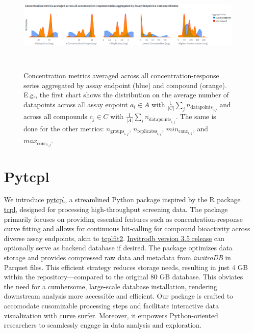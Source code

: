 \begin{figure}[htbp]  %
    \centering
    \includegraphics[width=1.0\textwidth]{figures/concentration_metric_distributions.png}  
    \caption{Concentration metrics averaged across all concentration-response series aggregated by assay endpoint (blue) and compound (orange). E.g., the first chart shows the distribution on the average number of datapoints across all assay enpoint $a_i \in A$ with $\frac{1}{|C|} \sum_{j} n_{\text{datapoints}_{i,j}}$ and across all compounds $c_j \in C$ with $\frac{1}{|A|} \sum_{i} n_{\text{datapoints}_{i,j}}$. The same is done for the other metrics: $n_{\text{groups}_{i,j}}$, $n_{\text{replicates}_{i,j}}$, $min_{\text{conc}_{i,j}}$, and $max_{\text{conc}_{i,j}}$.
    }
~\label{fig:concentration_metric_distributions} 
\end{figure}


\section{Pytcpl}
We introduce \href{https://github.com/rbBosshard/pytcpl}{pytcpl}, a streamlined Python package inspired by the R package \href{https://github.com/USEPA/CompTox-ToxCast-tcpl}{tcpl}, designed for processing high-throughput screening data. The package primarily focuses on providing essential features such as concentration-response curve fitting and allows for continuous hit-calling for compound bioactivity across diverse assay endpoints, akin to \href{https://github.com/USEPA/CompTox-ToxCast-tcplFit2}{tcplfit2}. \href{https://cfpub.epa.gov/si/si_public_record_Report.cfm?dirEntryId=355484&Lab=CCTE}{Invitrodb version 3.5 release} can optionally serve as backend database if desired. The package optimizes data storage and provides compressed raw data and metadata from \emph{invitroDB} in Parquet files. This efficient strategy reduces storage needs, resulting in just 4 GB within the repository—compared to the original 80 GB database. This obviates the need for a cumbersome, large-scale database installation, rendering downstream analysis more accessible and efficient. Our package is crafted to accomodate cusomizable processing steps and facilitate interactive data visualization with \href{https://pytcpl.streamlit.app/}{curve surfer}. Moreover, it empowers Python-oriented researchers to seamlessly engage in data analysis and exploration.

